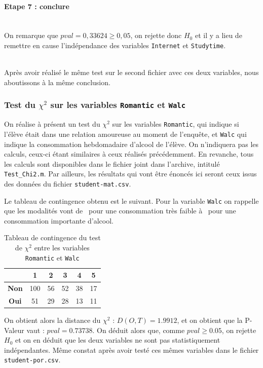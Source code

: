 \documentclass[11pt]{article}
\begin{document}
\paragraph{Etape 7 : conclure}~\\\indent
On remarque que $pval = 0,33624 \geq 0,05$, on rejette donc $H_0$ et il y a lieu de remettre en cause l'indépendance des variables \texttt{Internet} et \texttt{Studytime}.

~\\
Après avoir réalisé le même test sur le second fichier avec ces deux variables, nous aboutissons à la même conclusion.


\subsubsection{Test du $\chi^2$ sur les variables \texttt{Romantic} et \texttt{Walc}}
On réalise à présent un test du $\chi^2$ sur les variables \texttt{Romantic}, qui indique si l'élève était dans une relation amoureuse au moment de l'enquête, et \texttt{Walc} qui indique la consommation hebdomadaire d'alcool de l'élève. On n'indiquera pas les calculs, ceux-ci étant similaires à ceux réalisés précédemment. En revanche, tous les calculs sont disponibles dans le fichier joint dans l'archive, intitulé \texttt{Test\_Chi2.m}. Par ailleurs, les résultats qui vont être énoncés ici seront ceux issus des données du fichier \texttt{student-mat.csv}. 

Le tableau de contingence obtenu est le suivant. Pour la variable \texttt{Walc} on rappelle que les modalités vont de \fg\ pour une consommation très faible à \fg\ pour une consommation importante d'alcool.
\begin{table}[h] \centering \caption{Tableau de contingence du test de $\chi^2$ entre les variables \texttt{Romantic} et \texttt{Walc}}
\begin{tabular}{|c|c|c|c|c|c|}
  \hline
 	\backslashbox{\textbf{\emph{Romantic}}}{\textbf{\emph{Walc}}}& \textbf{1} & \textbf{2} & \textbf{3} & \textbf{4} & \textbf{5}\\
  \hline
          
          \textbf{Non} & 100 & 56 & 52 &  38 & 17\\\hline
          \textbf{Oui} & 51 & 29 & 28 & 13 & 11 \\\hline
          \end{tabular}
\end{table}

On obtient alors la distance du $\chi^2$ : $D(O,T)=1.9912$, et on obtient que la P-Valeur vaut : $pval = 0.73738$. On déduit alors que, comme $pval\geq 0.05$, on rejette $H_0$ et on en déduit que les deux variables ne sont pas statistiquement indépendantes. Même constat après avoir testé ces mêmes variables dans le fichier \texttt{student-por.csv}.
\end{document}
